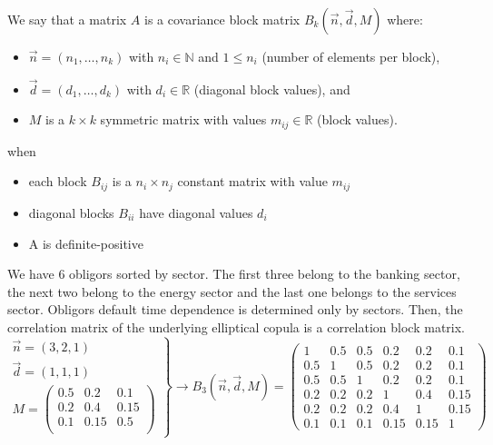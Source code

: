 \documentclass[11pt,fleqn]{book} %
\begin{document}
\begin{definition}
	We say that a matrix $A$ is a covariance block matrix $B_k(\vec{n},\vec{d},M)$
	where:
	\begin{itemize}
		\item $\vec{n}=(n_1,\dots,n_k)$ with $n_i \in \mathbb{N}$ and $1 \le n_i$ (number of elements per block),
		\item $\vec{d}=(d_1,\dots,d_k)$ with $d_i \in \mathbb{R}$ (diagonal block values), and
		\item $M$ is a $k {\times} k$ symmetric matrix with values $m_{ij} \in \mathbb{R}$ (block values).
	\end{itemize}
	when
	\begin{itemize}
		\item each block $B_{ij}$ is a $n_i {\times} n_j$ constant matrix with value $m_{ij}$
		\item diagonal blocks $B_{ii}$ have diagonal values $d_i$
		\item A is definite-positive
	\end{itemize}
\end{definition}

\begin{example}
	\label{example1}
	We have $6$ obligors sorted by sector. The first three belong to the 
	banking sector, the next two belong to the energy sector 
	and the last one belongs to the services sector. Obligors default time
	dependence is determined only by sectors. Then, the correlation matrix 
	of the underlying elliptical copula is a correlation block matrix.
	\small
	\begin{displaymath}
		\left.
		\begin{array}{l}
			\vec{n} = \left(3,2,1\right) \\
			\vec{d} = \left(1,1,1\right) \\
			M = \left(
			\begin{array}{ccc}
				0.5 & 0.2  & 0.1  \\
				0.2 & 0.4  & 0.15 \\
				0.1 & 0.15 & 0.5  \\
			\end{array}
			\right)
		\end{array}
		\right\}
		\rightarrow
		B_3(\vec{n},\vec{d},M)=
		\left(
		\begin{array}{ccc|cc|c} 
			1   & 0.5 & 0.5 & 0.2  & 0.2  & 0.1  \\ 
			0.5 & 1   & 0.5 & 0.2  & 0.2  & 0.1  \\ 
			0.5 & 0.5 & 1   & 0.2  & 0.2  & 0.1  \\ 
			\hline
			0.2 & 0.2 & 0.2 & 1    & 0.4  & 0.15 \\ 
			0.2 & 0.2 & 0.2 & 0.4  & 1    & 0.15 \\ 
			\hline
			0.1 & 0.1 & 0.1 & 0.15 & 0.15 & 1    
		\end{array} 
		\right)
	\end{displaymath}
\end{example}
\end{document}
